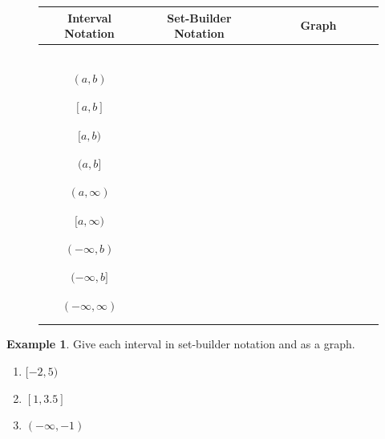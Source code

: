 \documentclass[addpoints,12pt]{exam}
\theoremstyle{definition}
\newtheorem{example}{Example}[subsection]
\begin{document}
\begin{figure}[h]
\centering
\begin{tabular}{c | c | c}
\textbf{Interval Notation} & \textbf{Set-Builder Notation} & \textbf{Graph}\\\hline
& &$\;\;\;\;\;\;\;\;\;\;\;\;\;\;\;\;\;\;\;\;\;\;\;\;\;\;\;\;\;\;\;\;\;\;\;$\\
& &\\
$(a,b)$ & & \\ 
& &\\\hline
& &\\
$[a,b]$ & & \\ 
& &\\\hline
& &\\
$[a,b)$ & & \\ 
& &\\\hline
& &\\
$(a,b]$ & & \\ 
& &\\\hline
& &\\
$(a,\infty)$ & & \\ 
& &\\\hline
& &\\
$[a,\infty)$ & & \\ 
& &\\\hline
& &\\
$(-\infty,b)$ & & \\ 
& &\\\hline
& &\\
$(-\infty,b]$ & & \\ 
& &\\\hline
& &\\
$(-\infty,\infty)$ & & \\ 
& &\\
& &\\
\end{tabular}
\end{figure}

\begin{example}
Give each interval in set-builder notation and as a graph.
\begin{enumerate}
\item $[-2,5)$
\vspace{.5in}
\item $[1,3.5]$
\vspace{.5in}
\item $(-\infty,-1)$
\vspace{.5in}
\end{enumerate}
\end{example}
\end{document}
